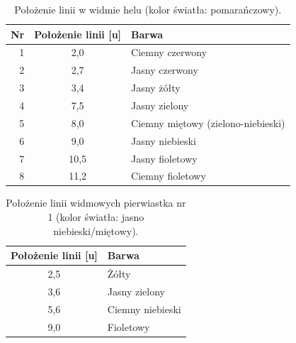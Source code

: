 \documentclass[a4paper,12pt]{article}
\begin{document}
\begin{table}[H]
    \centering
    \begin{tabular}{|r|c|l|}
        \hline
        Nr & Położenie linii [u] & Barwa \\ \hline
        1 & 2{,}0 & Ciemny czerwony \\ \hline
        2 & 2{,}7 & Jasny czerwony \\ \hline
        3 & 3{,}4 & Jasny żółty \\ \hline
        4 & 7{,}5 & Jasny zielony \\ \hline
        5 & 8{,}0 & Ciemny miętowy (zielono-niebieski) \\ \hline
        6 & 9{,}0 & Jasny niebieski \\ \hline
        7 & 10{,}5 & Jasny fioletowy \\ \hline
        8 & 11{,}2 & Ciemny fioletowy \\ \hline
    \end{tabular}
    \caption{Położenie linii w widmie helu (kolor światła: pomarańczowy).}
    \label{tab:hel}
\end{table}

\begin{table}[H]
    \centering
    \begin{tabular}{|c|l|}
        \hline
        Położenie linii [u] & Barwa \\ \hline
        2{,}5 & Żółty \\ \hline
        3{,}6 & Jasny zielony \\ \hline
        5{,}6 & Ciemny niebieski \\ \hline
        9{,}0 & Fioletowy \\ \hline
    \end{tabular}
    \caption{Położenie linii widmowych pierwiastka nr 1 (kolor światła: jasno niebieski/miętowy).}
\end{table}
\end{document}
